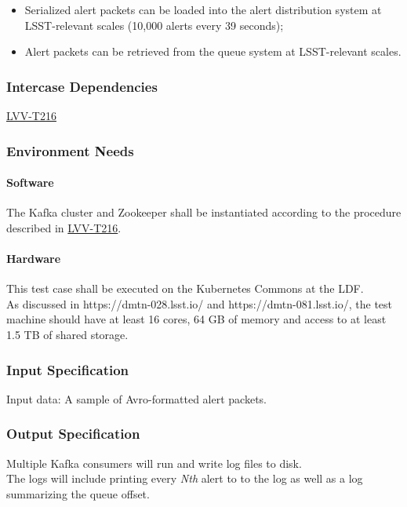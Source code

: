 \begin{itemize}
\tightlist
\item
  Serialized alert packets can be loaded into the alert distribution
  system at LSST-relevant scales (10,000 alerts every 39 seconds);
\item
  Alert packets can be retrieved from the queue system at LSST-relevant
  scales.
\end{itemize}



\subsubsection{Intercase Dependencies}
\href{https://jira.lsstcorp.org/secure/Tests.jspa\#/testCase/LVV-T216}{LVV-T216}


\subsubsection{Environment Needs}

\paragraph{Software}
The Kafka cluster and Zookeeper shall be instantiated according to the
procedure described in
\href{https://jira.lsstcorp.org/secure/Tests.jspa\#/testCase/LVV-T216}{LVV-T216}.


\paragraph{Hardware}
This test case shall be executed on the Kubernetes Commons at the LDF.\\
As discussed in https://dmtn-028.lsst.io/ and https://dmtn-081.lsst.io/,
the test machine should have at least 16 cores, 64 GB of memory and
access to at least 1.5 TB of shared storage.


\subsubsection{Input Specification}
Input data: A sample of Avro-formatted alert packets.


\subsubsection{Output Specification}
Multiple Kafka consumers will run and write log files to disk.\\
The logs will include printing every \emph{Nth} alert to to the log as
well as a log summarizing the queue offset.


